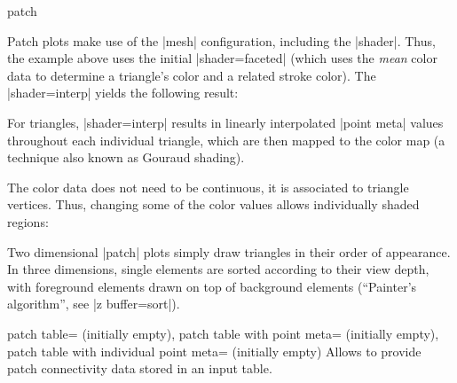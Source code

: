 {\begin{plottype}[/pgfplots]{patch}
\begin{codeexample}[]
\end{codeexample}
	Patch plots make use of the |mesh| configuration, including the |shader|. Thus, the example above uses the initial |shader=faceted| (which uses the \emph{mean} color data to determine a triangle's color and a related stroke color). The |shader=interp| yields the following result:
\begin{codeexample}[]
\end{codeexample}
	\noindent For triangles, |shader=interp| results in linearly interpolated |point meta| values throughout each individual triangle, which are then mapped to the color map (a technique also known as Gouraud shading).

	The color data does not need to be continuous, it is associated to triangle vertices. Thus, changing some of the color values allows individually shaded regions:
\begin{codeexample}[]
\end{codeexample}
	
	Two dimensional |patch| plots simply draw triangles in their order of appearance. In three dimensions, single elements are sorted according to their view depth, with foreground elements drawn on top of background elements (``Painter's algorithm'', see |z buffer=sort|).

\begin{pgfplotskeylist}{%
	patch table= (initially empty),%
	patch table with point meta= (initially empty),%
	patch table with individual point meta= (initially empty)%
}
	Allows to provide patch connectivity data stored in an input table.


\end{pgfplotskeylist}
\end{plottype}}
